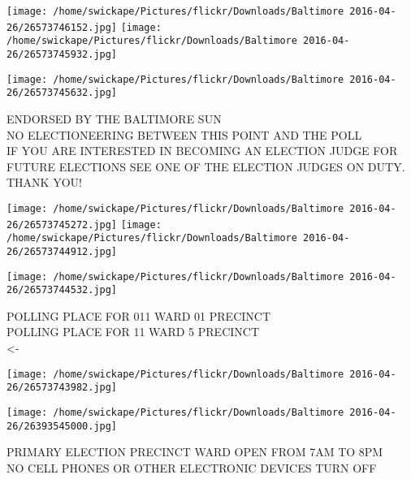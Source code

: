 \documentclass[10pt,letterpaper]{article}
\begin{document}
\texttt{[image: /home/swickape/Pictures/flickr/Downloads/Baltimore 2016-04-26/26573746152.jpg]}
\texttt{[image: /home/swickape/Pictures/flickr/Downloads/Baltimore 2016-04-26/26573745932.jpg]}

\vspace{0.25in}
\texttt{[image: /home/swickape/Pictures/flickr/Downloads/Baltimore 2016-04-26/26573745632.jpg]}

ENDORSED BY THE BALTIMORE SUN\\
NO ELECTIONEERING BETWEEN THIS POINT AND THE POLL\\
IF YOU ARE INTERESTED IN BECOMING AN ELECTION JUDGE FOR FUTURE ELECTIONS SEE ONE OF THE ELECTION JUDGES ON DUTY.  THANK YOU!
\pagebreak

\texttt{[image: /home/swickape/Pictures/flickr/Downloads/Baltimore 2016-04-26/26573745272.jpg]}
\texttt{[image: /home/swickape/Pictures/flickr/Downloads/Baltimore 2016-04-26/26573744912.jpg]}

\texttt{[image: /home/swickape/Pictures/flickr/Downloads/Baltimore 2016-04-26/26573744532.jpg]}

POLLING PLACE FOR 011 WARD 01 PRECINCT\\
POLLING PLACE FOR 11 WARD 5 PRECINCT\\
<{-}
\pagebreak

\texttt{[image: /home/swickape/Pictures/flickr/Downloads/Baltimore 2016-04-26/26573743982.jpg]}

\vspace{0.25in}
\texttt{[image: /home/swickape/Pictures/flickr/Downloads/Baltimore 2016-04-26/26393545000.jpg]}

PRIMARY ELECTION PRECINCT WARD OPEN FROM 7AM TO 8PM\\
NO CELL PHONES OR OTHER ELECTRONIC DEVICES TURN OFF
\pagebreak
\end{document}
